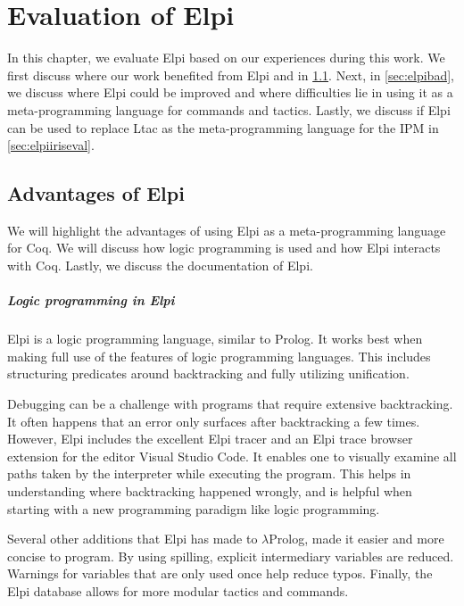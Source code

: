 \documentclass[thesis.tex]{subfiles}
\begin{document}
\VerbatimFootnotes

\chapter{Evaluation of Elpi} \label{ch:evalelpi}
In this chapter, we evaluate Elpi based on our experiences during this work. We first discuss where our work benefited from Elpi and \ce in \cref{sec:elpigood}. Next, in \cref{sec:elpibad}, we discuss where Elpi could be improved and where difficulties lie in using it as a meta-programming language for commands and tactics. Lastly, we discuss if Elpi can be used to replace Ltac as the meta-programming language for the IPM in \cref{sec:elpiiriseval}.

\section{Advantages of Elpi}\label{sec:elpigood}
We will highlight the advantages of using Elpi as a meta-programming language for Coq. We will discuss how logic programming is used and how Elpi interacts with Coq. Lastly, we discuss the documentation of Elpi.

\paragraph{Logic programming in Elpi}
Elpi is a logic programming language, similar to Prolog. It works best when making full use of the features of logic programming languages. This includes structuring predicates around backtracking and fully utilizing unification.

Debugging can be a challenge with programs that require extensive backtracking. It often happens that an error only surfaces after backtracking a few times. However, Elpi includes the excellent Elpi tracer and an Elpi trace browser extension \cite{tassiLPCICElpilang2023} for the editor Visual Studio Code. It enables one to visually examine all paths taken by the interpreter while executing the program. This helps in understanding where backtracking happened wrongly, and is helpful when starting with a new programming paradigm like logic programming.

Several other additions that Elpi has made to $\lambda$Prolog, made it easier and more concise to program. By using spilling, explicit intermediary variables are reduced. Warnings for variables that are only used once help reduce typos. Finally, the Elpi database allows for more modular tactics and commands.
\end{document}
